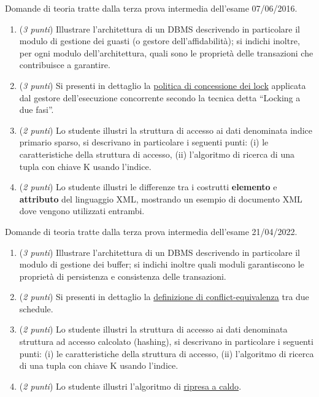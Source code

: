 \documentclass[a4paper]{article}
\newcommand{\dquotes}[1]{``#1''}
\begin{document}
	Domande di teoria tratte dalla terza prova intermedia dell'esame 07/06/2016.
	\begin{enumerate}
		\item (\emph{3 punti}) Illustrare l'architettura di un DBMS descrivendo in particolare il modulo di gestione dei guasti (o gestore dell'affidabilità); si indichi inoltre, per ogni modulo dell'architettura, quali sono le proprietà delle transazioni che contribuisce a garantire.
		
		\item (\emph{3 punti}) Si presenti in dettaglio la \underline{politica di concessione dei lock} applicata dal gestore dell'esecuzione concorrente secondo la tecnica detta \dquotes{Locking a due fasi}.
		
		\item (\emph{2 punti}) Lo studente illustri la struttura di accesso ai dati denominata indice primario sparso, si descrivano in particolare i seguenti punti: (i) le caratteristiche della struttura di accesso, (ii) l'algoritmo di ricerca di una tupla con chiave K usando l'indice.
		
		\item (\emph{2 punti}) Lo studente illustri le differenze tra i costrutti \textbf{elemento} e \textbf{attributo} del linguaggio XML, mostrando un esempio di documento XML dove vengono utilizzati entrambi.
	\end{enumerate}\newpage
	
	Domande di teoria tratte dalla terza prova intermedia dell'esame 21/04/2022.
	\begin{enumerate}
		\item (\emph{3 punti}) Illustrare l'architettura di un DBMS descrivendo in particolare il modulo di gestione dei buffer; si indichi inoltre quali moduli garantiscono le proprietà di persistenza e consistenza delle transazioni.
		
		\item (\emph{2 punti}) Si presenti in dettaglio la \underline{definizione di conflict-equivalenza} tra due schedule.
		
		\item (\emph{2 punti}) Lo studente illustri la struttura di accesso ai dati denominata struttura ad accesso calcolato (hashing), si descrivano in particolare i seguenti punti: (i) le caratteristiche della struttura di accesso, (ii) l'algoritmo di ricerca di una tupla con chiave K usando l'indice.
		
		\item (\emph{2 punti}) Lo studente illustri l'algoritmo di \underline{ripresa a caldo}.
	\end{enumerate}\newpage
	
\end{document}
